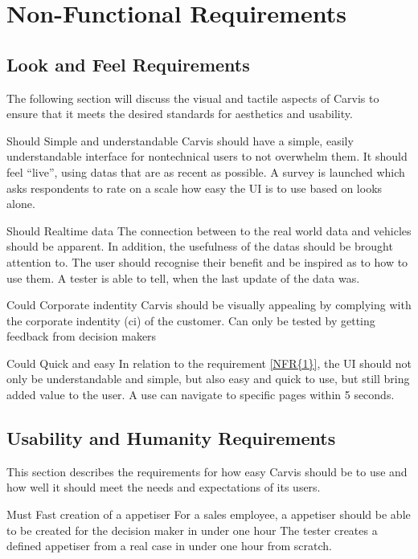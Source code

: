 \chapter{Non-Functional Requirements}

\section{Look and Feel Requirements}
The following section will discuss the visual and tactile aspects of Carvis to ensure that it meets the desired standards for aesthetics and usability.
\label{sec:appearancerequirements}

{Should}
{Simple and understandable}
{Carvis should have a simple, easily understandable interface for \gls{nontechnical} users to not overwhelm them. It should feel \enquote{live}, using \glspl{data} that are as recent as possible.}
{A survey is launched which asks respondents to rate on a scale how easy the UI is to use based on looks alone.}

{Should}
{Realtime data}
{The connection between to the real world data and vehicles should be apparent. In addition, the usefulness of the \glspl{data} should be brought attention to. The user should recognise their benefit and be inspired as to how to use them.}
{A tester is able to tell, when the last update of the data was.}

{Could}
{Corporate indentity}
{Carvis should be visually appealing by complying with the corporate indentity (\gls{ci}) of the customer.}
{Can only be tested by getting feedback from decision makers}

{Could}
{Quick and easy}
{In relation to the requirement \autoref{NFR{1}}, the UI should not only be understandable and simple, but also easy and quick to use, but still bring added value to the user.}
{A use can navigate to specific pages within 5 seconds.}

\section{Usability and Humanity Requirements}
This section describes the requirements for how easy Carvis should be to use and how well it should meet the needs and expectations of its users.

{Must}
{Fast creation of a \gls{appetiser}}
{For a sales employee, a \gls{appetiser} should be able to be created for the decision maker in under one hour}
{The tester creates a defined \gls{appetiser} from a real case in under one hour from scratch.}

